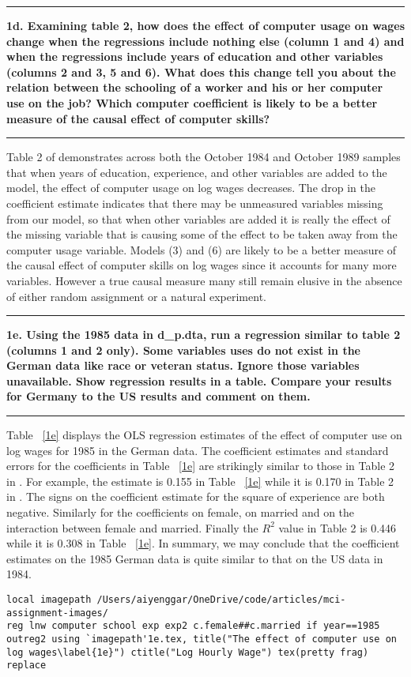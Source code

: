 \documentclass[12pt]{article}
\newcommand\question[1]{\vspace{1em}\hrule\vspace{1em}\textbf{#1}\vspace{1em}\hrule\vspace{1em}}
\begin{document}
\question{1d. Examining \cite{Krueger1993} table 2, how does the effect of computer usage on wages change when the regressions include nothing else (column 1 and 4) and when the regressions include years of education and other variables (columns 2 and 3, 5 and 6). What does this change tell you about the relation between the schooling of a worker and his or her computer use on the job? Which computer coefficient is likely to be a better measure of the causal effect of computer skills?}
Table 2 of \cite{Krueger1993} demonstrates across both the October 1984 and October 1989 samples that when years of education, experience, and other variables are added to the model, the effect of computer usage on log wages decreases. The drop in the coefficient estimate indicates that there may be unmeasured variables missing from our model, so that when other variables are added it is really the effect of the missing variable that is causing some of the effect to be taken away from the computer usage variable. Models (3) and (6) are likely to be a better measure of the causal effect of computer skills on log wages since it accounts for many more variables. However a true causal measure many still remain elusive in the absence of either random assignment or a natural experiment.

\question{1e. Using the 1985 data in d\_p.dta, run a regression similar to \cite{Krueger1993} table 2 (columns 1 and 2 only). Some variables \cite{Krueger1993} uses do not exist in the German data like race or veteran status. Ignore those variables unavailable. Show regression results in a table. Compare your results for Germany to the US results and comment on them.}
Table ~\ref{1e} displays the OLS regression estimates of the effect of computer use on log wages for 1985 in the German data. The coefficient estimates and standard errors for the coefficients in Table ~\ref{1e} are strikingly similar to those in Table 2 in \cite{Krueger1993}. For example, the estimate is 0.155 in Table ~\ref{1e} while it is 0.170 in Table 2 in \cite{Krueger1993}. The signs on the coefficient estimate for the square of experience are both negative. Similarly for the coefficients on female, on married and on the interaction between female and married. Finally the $R^2$ value in \cite{Krueger1993} Table 2 is 0.446 while it is 0.308 in Table ~\ref{1e}. In summary, we may conclude that the coefficient estimates on the 1985 German data is quite similar to that on the US data in 1984.

\begin{lstlisting}
local imagepath /Users/aiyenggar/OneDrive/code/articles/mci-assignment-images/
reg lnw computer school exp exp2 c.female##c.married if year==1985
outreg2 using `imagepath'1e.tex, title("The effect of computer use on log wages\label{1e}") ctitle("Log Hourly Wage") tex(pretty frag) replace
\end{lstlisting}
\end{document}

